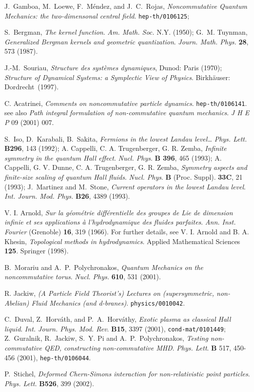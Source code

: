 \documentclass[a4paper,11pt]{article}
\begin{document}
\begin{thebibliography}{99}
J.~Gamboa, M.~Loewe, F.~M\'endez, and J.~C.~Rojas,
{\it Noncommutative Quantum Mechanics: the two-dimensonal central
field}. \texttt{hep-th/0106125};

S.~Bergman,
{\it The kernel function}.
{\sl Am. Math. Soc.} N.Y. (1950);
  G.~M. Tuynman,
  {\it Generalized Bergman kernels and geometric quantization}.
{\sl Journ. Math. Phys.} {\bf 28}, 573 (1987).


J.-M.~Souriau,
{\it Structure des syst\`emes dynamiques},
Dunod: Paris (1970);
{\it Structure of Dynamical Systems: a Symplectic View of Physics}.
Birkh\"auser: Dordrecht~(1997).

C. Acatrinei,
{\it Comments on noncommutative particle dynamics}. \texttt{hep-th/0106141}.
see also
{\it Path integral formulation of non-commutative quantum mechanics}.
{\sl J H E P} 09 (2001) 007.

S.~Iso, D.~Karabali, B.~Sakita,
{\it Fermions in the lowest Landau level\dots}
{\sl Phys. Lett.} {\bf   B296}, 143 (1992);
A. Cappelli, C. A. Trugenberger, G. R. Zemba,
{\it Infinite symmetry in the quantum Hall effect}.
{\sl Nucl. Phys}. {\bf   B 396}, 465 (1993);
A. Cappelli, G. V. Dunne, C. A. Trugenberger, G. R. Zemba,
{\it Symmetry aspects and finite-size scaling of quantum Hall fluids}.
{\sl Nucl. Phys}. {\bf  B} (Proc. Suppl). {\bf 33C}, 21 (1993);
J.~Martinez and M.~Stone,
{\it Current operators in the lowest Landau level}.
{\sl Int. Journ. Mod. Phys.} {\bf B26}, 4389 (1993).

V. I. Arnold,
{\it Sur la g\'eom\'etrie diff\'erentielle des groupes de Lie
de dimension infinie et ses applications \`a l'hydrodynamique des
fluides parfaites}.
{\sl Ann. Inst. Fourier} (Grenoble) {\bf 16}, 319 (1966).
For further details, see
V. I. Arnold and B. A. Khesin,
{\it Topological methods in hydrodynamics}.
Applied Mathematical Sciences {\bf 125}.
Springer (1998).


B.~Morariu and A.~P.~Polychronakos,
{\it Quantum Mechanics on the noncommutative torus}.
{\sl Nucl. Phys.} {\bf 610}, 531 (2001).

  {R. Jackiw}, {\sl (A Particle Field Theorist's)
  Lectures on (supersymmetric, non-Abelian) Fluid Mechanics
  (and d-branes)}. \texttt{physics/0010042}.

  C.~Duval, Z.~Horv\'ath, and P.~A.~Horv\'athy,
  {\it Exotic plasma as classical Hall liquid}.
  {\sl Int. Journ. Phys. Mod. Rev}. {\bf B15},
3397 (2001), \texttt{cond-mat/0101449};
{Z.~Guralnik, R.~Jackiw, S.~Y. Pi and A.~P.~Polychronakos},
  {\it Testing non-commutative QED, constructing non-commutative MHD}.
   {\sl Phys. Lett}. {\bf B} 517, 450-456 (2001),
   \texttt{hep-th/0106044}.

P.~Stichel,
{\it Deformed Chern-Simons interaction for non-relativistic point particles}.
{\sl Phys. Lett.} {\bf B526}, 399 (2002).

\end{thebibliography}
\end{document}
